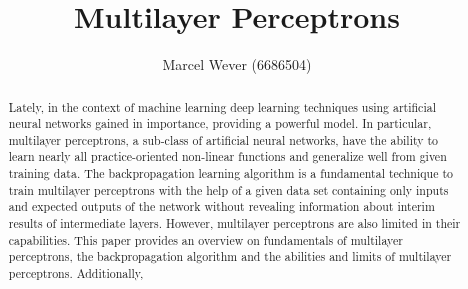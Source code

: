 \documentclass[runningheads,a4paper]{llncs}
\begin{document}


\title{Multilayer Perceptrons}

\author{Marcel Wever (6686504)}

%
\iffalse
\author{Marcel Wever\inst{1}}

\institute{
Paderborn University\\
\email{wever@mail.uni-paderborn.de}
}
\fi
			
\maketitle

\begin{abstract}
Lately, in the context of machine learning deep learning techniques using artificial neural networks gained in importance, providing a powerful model. In particular, multilayer perceptrons, a sub-class of artificial neural networks, have the ability to learn nearly all practice-oriented non-linear functions and generalize well from given training data. The backpropagation learning algorithm is a fundamental technique to train multilayer perceptrons with the help of a given data set containing only inputs and expected outputs of the network without revealing information about interim results of intermediate layers. However, multilayer perceptrons are also limited in their capabilities. This paper provides an overview on fundamentals of multilayer perceptrons, the backpropagation algorithm and the abilities and limits of multilayer perceptrons. Additionally, 
\end{abstract}

\end{document}
